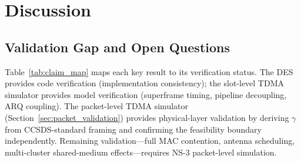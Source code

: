 \documentclass[journal]{IEEEtran}
\begin{document}
\section{Discussion}

\subsection{Validation Gap and Open Questions}
\label{sec:validation_gap}

Table~\ref{tab:claim_map} maps each key result to its verification status. The DES provides code verification (implementation consistency); the slot-level TDMA simulator provides model verification (superframe timing, pipeline decoupling, ARQ coupling). The packet-level TDMA simulator (Section~\ref{sec:packet_validation}) provides physical-layer validation by deriving $\gamma$ from CCSDS-standard framing and confirming the feasibility boundary independently. Remaining validation---full MAC contention, antenna scheduling, multi-cluster shared-medium effects---requires NS-3 packet-level simulation.
\end{document}
